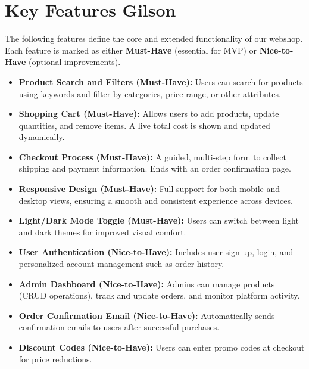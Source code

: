 \documentclass[a4paper,12pt]{article}
\begin{document}
	\section{Key Features Gilson}

The following features define the core and extended functionality of our webshop. Each feature is marked as either \textbf{Must-Have} (essential for MVP) or \textbf{Nice-to-Have} (optional improvements).

\begin{itemize}
    \item \textbf{Product Search and Filters (Must-Have):}  
    Users can search for products using keywords and filter by categories, price range, or other attributes.
    
    \item \textbf{Shopping Cart (Must-Have):}  
    Allows users to add products, update quantities, and remove items. A live total cost is shown and updated dynamically.
    
    \item \textbf{Checkout Process (Must-Have):}  
    A guided, multi-step form to collect shipping and payment information. Ends with an order confirmation page.
    
    \item \textbf{Responsive Design (Must-Have):}  
    Full support for both mobile and desktop views, ensuring a smooth and consistent experience across devices.
    
    \item \textbf{Light/Dark Mode Toggle (Must-Have):}  
    Users can switch between light and dark themes for improved visual comfort.
    
    \item \textbf{User Authentication (Nice-to-Have):}  
    Includes user sign-up, login, and personalized account management such as order history.
    
    \item \textbf{Admin Dashboard (Nice-to-Have):}  
    Admins can manage products (CRUD operations), track and update orders, and monitor platform activity.
    
    \item \textbf{Order Confirmation Email (Nice-to-Have):}  
    Automatically sends confirmation emails to users after successful purchases.
    
    \item \textbf{Discount Codes (Nice-to-Have):}  
    Users can enter promo codes at checkout for price reductions.
\end{itemize}
\end{document}

